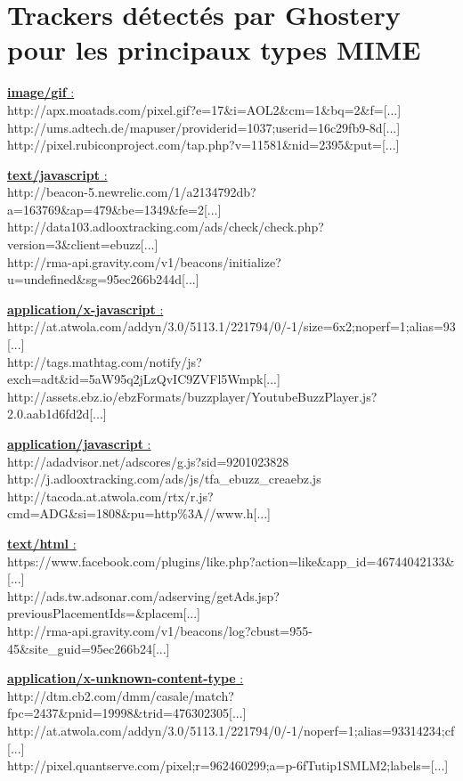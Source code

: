 \chapter{Trackers détectés par Ghostery pour les principaux types MIME}
\label{ghostery_mimetypes}

\underline{\textbf{image/gif} :}\\
 http://apx.moatads.com/pixel.gif?e=17\&i=AOL2\&cm=1\&bq=2\&f=[...]\\
 http://ums.adtech.de/mapuser/providerid=1037;userid=16c29fb9-8d[...]\\
 http://pixel.rubiconproject.com/tap.php?v=11581\&nid=2395\&put=[...]

\underline{\textbf{text/javascript} :}\\
 http://beacon-5.newrelic.com/1/a2134792db?a=163769\&ap=479\&be=1349\&fe=2[...]\\
 http://data103.adlooxtracking.com/ads/check/check.php?version=3\&client=ebuzz[...]\\
 http://rma-api.gravity.com/v1/beacons/initialize?u=undefined\&sg=95ec266b244d[...]

\underline{\textbf{application/x-javascript} :}\\
 http://at.atwola.com/addyn/3.0/5113.1/221794/0/-1/size=6x2;noperf=1;alias=93[...]\\
 http://tags.mathtag.com/notify/js?exch=adt\&id=5aW95q2jLzQvIC9ZVFl5Wmpk[...]\\
 http://assets.ebz.io/ebzFormats/buzzplayer/YoutubeBuzzPlayer.js?2.0.aab1d6fd2d[...]

\underline{\textbf{application/javascript} :}\\
 http://adadvisor.net/adscores/g.js?sid=9201023828\\
 http://j.adlooxtracking.com/ads/js/tfa\_ebuzz\_creaebz.js\\
 http://tacoda.at.atwola.com/rtx/r.js?cmd=ADG\&si=1808\&pu=http\%3A//www.h[...]

\underline{\textbf{text/html} :}\\
 https://www.facebook.com/plugins/like.php?action=like\&app\_id=46744042133\&[...]\\
 http://ads.tw.adsonar.com/adserving/getAds.jsp?previousPlacementIds=\&placem[...]\\
 http://rma-api.gravity.com/v1/beacons/log?cbust=955-45\&site\_guid=95ec266b24[...]

\underline{\textbf{application/x-unknown-content-type} :}\\
 http://dtm.cb2.com/dmm/casale/match?fpc=2437\&pnid=19998\&trid=476302305[...]\\
 http://at.atwola.com/addyn/3.0/5113.1/221794/0/-1/noperf=1;alias=93314234;cf[...]\\
 http://pixel.quantserve.com/pixel;r=962460299;a=p-6fTutip1SMLM2;labels=[...]
